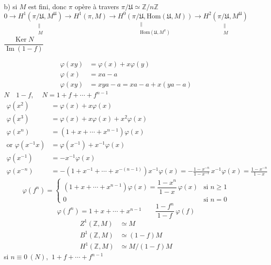 \documentclass[11pt,a4paper]{article}
\begin{document}
b) si $M$ est fini, donc $\pi$ opère à travers $\pi/\mathfrak{U} \simeq
\mathbb{Z}/n\mathbb{Z}$
\[
  0 \to \underset{\substack{\parallel \\ M}}{H^{1}(\pi/\mathfrak{U}, M^{\mathfrak{U}})}
  \to H^{1}(\pi, M) \to
  \underset{\substack{\parallel \\ \mathrm{Hom}(\mathfrak{U}, M^{\pi})}}{H^{0}(\pi/\mathfrak{U}, \mathrm{Hom}(\mathfrak{U}, M))}
  \to \underset{\substack{\parallel \\ M}}{H^{2}(\pi/\mathfrak{U}, M^{\mathfrak{U}})}
\]
 $\dfrac{\operatorname{Ker} N}{\operatorname{Im}(1-f)}$


\[
\begin{aligned}
  \varphi(xy) &= \varphi(x) + x\varphi(y) \\
  \varphi(x) &= xa - a \\
  \varphi(xy) &= xya - a = xa - a + x(ya - a)
\end{aligned}
\]
$N \quad 1 - f$, $\quad N = 1 + f + \cdots + f^{n-1}$
\[
\begin{aligned}
  \varphi(x^{2}) &= \varphi(x) + x\varphi(x) \\
  \varphi(x^{3}) &= \varphi(x) + x\varphi(x) + x^{2}\varphi(x) \\
  \varphi(x^{n}) &= (1 + x + \cdots + x^{n-1})\varphi(x) \\
  \text{or } \varphi(x^{-1}x) &= \varphi(x^{-1}) + x^{-1}\varphi(x) \\
  \varphi(x^{-1}) &= -x^{-1}\varphi(x) \\
  \varphi(x^{-n}) &= -(1 + x^{-1} + \cdots + x^{-(n-1)})x^{-1}\varphi(x)
  = -\frac{1 - x^{-n}}{1 - x^{-1}}\, x^{-1}\varphi(x) = \frac{1 - x^{-n}}{1 - x}
\end{aligned}
\]
\[
  \varphi(f^{n}) =
  \begin{cases}
    (1 + x + \cdots + x^{n-1})\varphi(x) = \dfrac{1 - x^{n}}{1 - x}\,\varphi(x) & \text{si } n \geq 1 \\
    0 & \text{si } n = 0
  \end{cases}
\]
\[
  \varphi(f^{n}) = 1 + x + \cdots + x^{n-1} \qquad \frac{1 - f^{n}}{1 - f}\,\varphi(f)
\]
\[
\begin{aligned}
  Z^{1}(\mathbb{Z}, M) &\simeq M \\
  B^{1}(\mathbb{Z}, M) &\simeq (1-f)M \\
  H^{1}(\mathbb{Z}, M) &\simeq M/(1-f)M
\end{aligned}
\]
si $n \equiv 0 \ (N)$, $\ 1 + f + \cdots + f^{n-1}$
\end{document}
